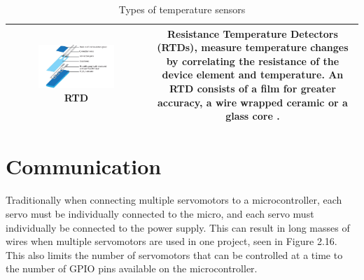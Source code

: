 \begin{table}[H]
\begin{tabular}{|c|c|}
      \hline      
      \begin{minipage}[b]{0.6\textwidth}
        \begin{figure}[H]
              \includegraphics[width=1\textwidth]{RTD.jpg}
              \vspace{-5mm}
              \caption{RTD}
              \vspace{2mm}
        \end{figure}
      \end{minipage}
         &  
        \begin{minipage}[b]{0.39\textwidth}
            \textbf{Resistance Temperature Detectors (RTDs)}, measure temperature changes by correlating the resistance of the device element and temperature. An RTD consists of a film for greater accuracy, a wire wrapped ceramic or a glass core \cite{Temprature_sensor}. 
            \vspace{13mm}
        \end{minipage}\\
        \hline
    \end{tabular}
    \caption{Types of temperature sensors}
\end{table}

\newpage
\section{Communication}
Traditionally when connecting multiple servomotors to a microcontroller, each servo must be individually connected to the micro, and each servo must individually be connected to the power supply. This can result in long masses of wires when multiple servomotors are used in one project, seen in Figure 2.16. This also limits the number of servomotors that can be controlled at a time to the number of GPIO pins available on the microcontroller.

